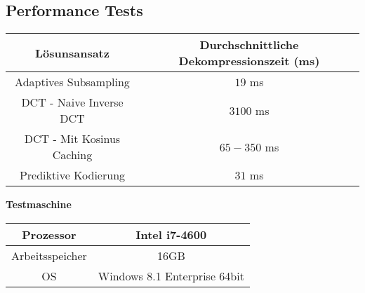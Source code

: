 \subsection*{Performance Tests} \label{anhang:performance}
\begin{table}[!htbp]
\center
\begin{tabular}{c|c}
	Lösunsansatz & Durchschnittliche Dekompressionszeit (ms) \\\hline
	Adaptives Subsampling & $19$ ms \\
	DCT - Naive Inverse DCT & $3100$ ms \\
	DCT - Mit Kosinus Caching & $65-350$ ms\\
	Prediktive Kodierung & $31$ ms\\
\end{tabular}
\end{table}

\textbf{Testmaschine}
\begin{table}[!htbp]
\center
\begin{tabular}{c|c}
	Prozessor & Intel i7-4600 \\\hline
	Arbeitsspeicher & 16GB \\
	OS & Windows 8.1 Enterprise 64bit \\
\end{tabular}
\end{table}
